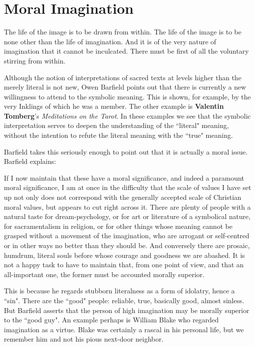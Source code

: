 \section{Moral Imagination}

\begin{quotex}
The life of the image is to be drawn from within. The life of the image is to be none other than the life of imagination. And it is of the very nature of imagination that it cannot be inculcated. There must be first of all the voluntary stirring from within. 

\end{quotex}
Although the notion of interpretations of sacred texts at levels higher than the merely literal is not new, Owen Barfield points out that there is currently a new willingness to attend to the symbolic meaning. This is shown, for example, by the very Inklings of which he was a member. The other example is \textbf{Valentin Tomberg}'s \emph{Meditations on the Tarot}. In these examples we see that the symbolic interpretation serves to deepen the understanding of the ``literal" meaning, without the intention to refute the literal meaning with the ``true" meaning.

Barfield takes this seriously enough to point out that it is actually a moral issue. Barfield explains:

\begin{quotex}
If I now maintain that these have a moral significance, and indeed a paramount moral significance, I am at once in the difficulty that the scale of values I have set up not only does not correspond with the generally accepted scale of Christian moral values, but appears to cut right across it. There are plenty of people with a natural taste for dream-psychology, or for art or literature of a symbolical nature, for sacramentalism in religion, or for other things whose meaning cannot be grasped without a movement of the imagination, who are arrogant or self-centred or in other ways no better than they should be. And conversely there are prosaic, humdrum, literal souls before whose courage and goodness we are abashed. It is not a happy task to have to maintain that, from one point of view, and that an all-important one, the former must be accounted morally superior.

\end{quotex}
This is because he regards stubborn literalness as a form of idolatry, hence a ``sin". There are the ``good" people: reliable, true, basically good, almost sinless. But Barfield asserts that the person of high imagination may be morally superior to the ``good guy". An example perhaps is William Blake who regarded imagination as a virtue. Blake was certainly a rascal in his personal life, but we remember him and not his pious next-door neighbor.

